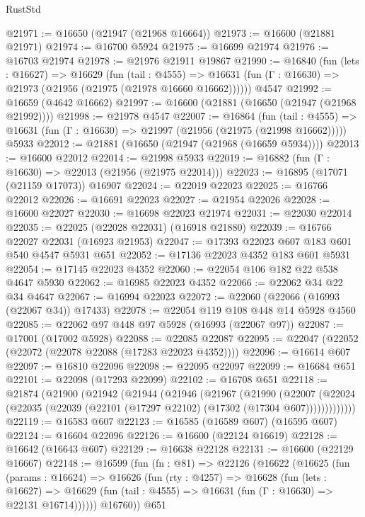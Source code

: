 \begin{lexlean}{RustStd}
\begin{coremodule}
@21971 := @16650 (@21947 (@21968 @16664))
@21973 := @16600 (@21881 @21971)
@21974 := @16700 @5924
@21975 := @16699 @21974
@21976 := @16703 @21974
@21978 := @21976 @21911 @19867
@21990 := @16840
    (fun (lets : @16627) =>
    @16629
      (fun (tail : @4555) =>
      @16631 (fun (Γ : @16630) => @21973 (@21956 (@21975 (@21978 @16660 @16662))))))
    @4547
@21992 := @16659 (@4642 @16662)
@21997 := @16600 (@21881 (@16650 (@21947 (@21968 @21992))))
@21998 := @21978 @4547
@22007 := @16864
    (fun (tail : @4555) => @16631 (fun (Γ : @16630) => @21997 (@21956 (@21975 (@21998 @16662)))))
    @5933
@22012 := @21881 (@16650 (@21947 (@21968 (@16659 @5934))))
@22013 := @16600 @22012
@22014 := @21998 @5933
@22019 := @16882 (fun (Γ : @16630) => @22013 (@21956 (@21975 @22014)))
@22023 := @16895 (@17071 (@21159 @17073)) @16907
@22024 := @22019 @22023
@22025 := @16766 @22012
@22026 := @16691 @22023
@22027 := @21954 @22026
@22028 := @16600 @22027
@22030 := @16698 @22023 @21974
@22031 := @22030 @22014
@22035 := @22025 (@22028 @22031) (@16918 @21880)
@22039 := @16766 @22027 @22031 (@16923 @21953)
@22047 := @17393 @22023 @607 @183 @601 @540 @4547 @5931 @651
@22052 := @17136 @22023 @4352 @183 @601 @5931
@22054 := @17145 @22023 @4352
@22060 := @22054 @106 @182 @22 @538 @4647 @5930
@22062 := @16985 @22023 @4352
@22066 := @22062 @34 @22 @34 @4647
@22067 := @16994 @22023
@22072 := @22060 (@22066 (@16993 (@22067 @34)) @17433)
@22078 := @22054 @119 @108 @448 @14 @5928 @4560
@22085 := @22062 @97 @448 @97 @5928 (@16993 (@22067 @97))
@22087 := @17001 (@17002 @5928)
@22088 := @22085 @22087
@22095 := @22047 (@22052 (@22072 (@22078 @22088 (@17283 @22023 @4352))))
@22096 := @16614 @607
@22097 := @16810 @22096
@22098 := @22095 @22097
@22099 := @16684 @651
@22101 := @22098 (@17293 @22099)
@22102 := @16708 @651
@22118 := @21874
    (@21900
      (@21942
        (@21944
          (@21946
            (@21967
              (@21990
                (@22007
                  (@22024 (@22035 (@22039 (@22101 (@17297 @22102) (@17302 (@17304 @607)))))))))))))
@22119 := @16583 @607
@22123 := @16585 (@16589 @607) (@16595 @607)
@22124 := @16604 @22096
@22126 := @16600 (@22124 @16619)
@22128 := @16642 (@16643 @607)
@22129 := @16638 @22128
@22131 := @16600 (@22129 @16667)
@22148 := @16599
    (fun (fn : @81) =>
    @22126
      (@16622
        (@16625
          (fun (params : @16624) =>
          @16626
            (fun (rty : @4257) =>
            @16628
              (fun (lets : @16627) =>
              @16629 (fun (tail : @4555) => @16631 (fun (Γ : @16630) => @22131 @16714))))))
        @16760))
    @651

\end{coremodule}
\end{lexlean}
